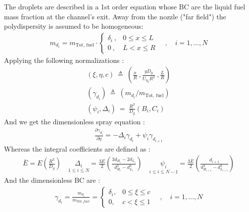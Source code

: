 \documentclass[12pt]{article}
\numberwithin{equation}{section}
\begin{document}
\begin{flushleft}
The droplets are described in a 1st order equation whose BC are the liquid fuel mass
fraction at the channel's exit. Away from the nozzle ("far field") the polydispersity is assumed to be homogeneous:
\begin{align} 
m_{d_{i}}=m_{\text{Tot, fuel}} \cdot \begin{cases}
\delta_{i} \ , & 0 \leq x \leq L \\
0 \ , & L<x \leq R
\end{cases} \quad , \quad i=1, \ldots, N
\end{align}
Applying the following normalizations :
\begin{align}
(\xi, \eta, c) \ \triangleq \ \left( \frac{x}{R} \ , \frac{y D_{g}}{U_{0_{g}} R^{2}} \ , \frac{L}{R} \right) \label{2_axes_norm} \\
\left(\gamma_{d_{i}}\right) \ \triangleq \ \left(m_{d_{i}} / m_{\text {Tot, fuel}}\right) \\
\left(\psi_{i}, \Delta_{i}\right)\ = \ \frac{R^{2}}{D_{g}}\left(B_{i}, C_{i}\right)
\end{align}
And we get the dimensionless spray equation :
\begin{align} 
\frac{\partial \gamma_{d_{i}}}{\partial \eta}=-\Delta_{i} \gamma_{d_{i}}+\psi_{i} \gamma_{d_{i+1}} \label{2_d_gamma}
\end{align}
Whereas the integral coefficients are defined as :
\begin{align}  
\bar{E}=E\left(\frac{R^{2}}{D_{g}}\right) \quad \underset{1 \leq i \leq N}{\Delta_i}=\frac{3 E}{2}\left(\frac{3 d_{H_{i}}-2 d_{L_{i}}}{d_{H_{i}}^{3}-d_{L_{i}}^{3}}\right) \quad \underset{i \leq i \leq N-1}{\psi_i} =\frac{3 \bar{E}}{2}\left(\frac{d_{i+1}}{d_{H_{i+1}}^{3}-d_{L_{i+1}}^{3}}\right)  \label{2_coeffs}
\end{align}
And the dimensionless BC are :
\begin{align} 
\gamma_{d_{i}}=\frac{m_{d_{i}}}{m_{Tot, fuel}}= \begin{cases}
\delta_{i}, & 0 \leq \xi \leq c \\
0, & c<\xi \leq 1  \end{cases} \quad , \quad  i=1, \ldots, N  \label{2_gamma}
\end{align}

\newpage


\end{flushleft}
\end{document}
